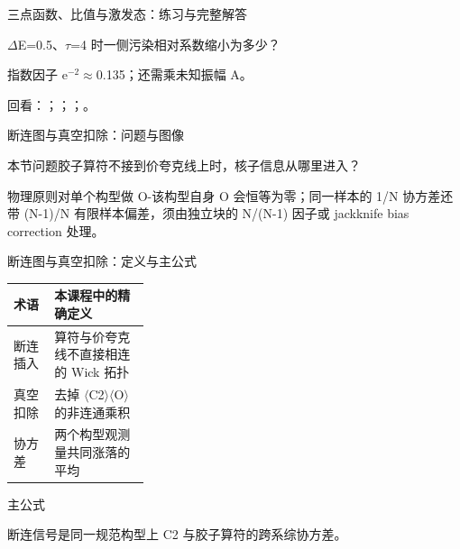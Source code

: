 \begin{frame}[t]{三点函数、比值与激发态：练习与完整解答}
\footnotesize
\begin{block}{}\ensuremath{\Delta}E=0.5、\ensuremath{\tau}=4 时一侧污染相对系数缩小为多少？\end{block}
\begin{exampleblock}{}指数因子 e\ensuremath{^{-2}}\ensuremath{\approx}0.135；还需乘未知振幅 A。\end{exampleblock}
\vfill
\scriptsize 回看：；；；。
\end{frame}

\begin{frame}[t]{断连图与真空扣除：问题与图像}
\footnotesize
\begin{block}{本节问题}胶子算符不接到价夸克线上时，核子信息从哪里进入？\end{block}
\begin{block}{物理原则}\quad 对单个构型做 O-该构型自身 O 会恒等为零；同一样本的 1/\allowbreak{}N 协方差还带 (N-1)/\allowbreak{}N 有限样本偏差，须由独立块的 N/\allowbreak{}(N-1) 因子或 jackknife bias correction 处理。\end{block}
\end{frame}

\begin{frame}[t]{断连图与真空扣除：定义与主公式}
\footnotesize\begin{tabularx}{\linewidth}{p{0.30\linewidth}Y}
\toprule 术语 & 本课程中的精确定义\\\midrule
{} 断连插入 & 算符与价夸克线不直接相连的 Wick 拓扑\\
 真空扣除 & 去掉 \ensuremath{\langle}C2\ensuremath{\rangle}\ensuremath{\langle}O\ensuremath{\rangle} 的非连通乘积\\
 协方差 & 两个构型观测量共同涨落的平均\\
\bottomrule\end{tabularx}\vspace{0.15cm}
\begin{block}{ 主公式}\centering{}\end{block}
断连信号是同一规范构型上 C2 与胶子算符的跨系综协方差。
\end{frame}

